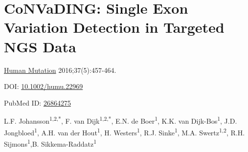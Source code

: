 \chapter[CoNVaDING: Single Exon Variation Detection in NGS data]{CoNVaDING: Single Exon Variation Detection in Targeted NGS Data}
\label{chap:CoNVaDING}

{ \Large {} }

\hfill \underline{Human Mutation} 2016;37(5):457-464.

\hfill DOI: \href{https://doi.org/10.1002/humu.22969}{10.1002/humu.22969}

\hfill PubMed ID: \href{https://www.ncbi.nlm.nih.gov/pubmed/26864275}{26864275}

\newpage

\noindent
L.F. Johansson\textsuperscript{1,2,*}, F. van Dijk\textsuperscript{1,2,*}, E.N. de Boer\textsuperscript{1}, K.K. van Dijk-Bos\textsuperscript{1}, J.D. Jongbloed\textsuperscript{1}, A.H. van der Hout\textsuperscript{1}, H. Westers\textsuperscript{1}, R.J. Sinke\textsuperscript{1}, M.A. Swertz\textsuperscript{1,2}, R.H. Sijmons\textsuperscript{1},B. Sikkema-Raddatz\textsuperscript{1}  \\

